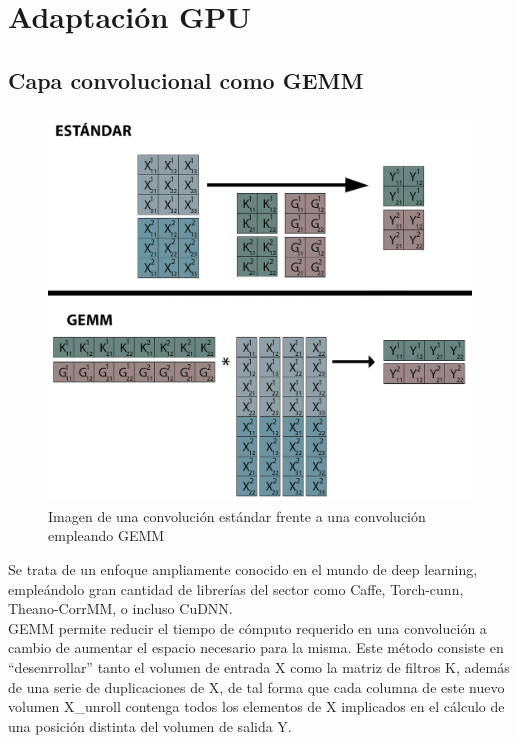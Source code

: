 \chapter{Adaptación GPU}


\section{Capa convolucional como GEMM}

\begin{figure}[H]
	\centering
	\includegraphics[scale=0.35]{imagenes/conv_std_vs_gemm.jpg}  
	\caption{Imagen de una convolución estándar frente a una convolución empleando GEMM}
	\label{fig:conv_std_vs_gemm}
\end{figure}
Se trata de un enfoque ampliamente conocido en el mundo de deep learning, empleándolo gran cantidad de librerías del sector como Caffe, Torch-cunn, Theano-CorrMM, o incluso CuDNN. \cite{conv_GEMM_FFT_comparacion} \\
GEMM permite reducir el tiempo de cómputo requerido en una convolución a cambio de aumentar el espacio necesario para la misma. Este método consiste en ``desenrrollar'' tanto el volumen de entrada X como la matriz de filtros K, además de una serie de duplicaciones de X, de tal forma que cada columna de este nuevo volumen X\_unroll contenga todos los elementos de X implicados en el cálculo de una posición distinta del volumen de salida Y. \\
